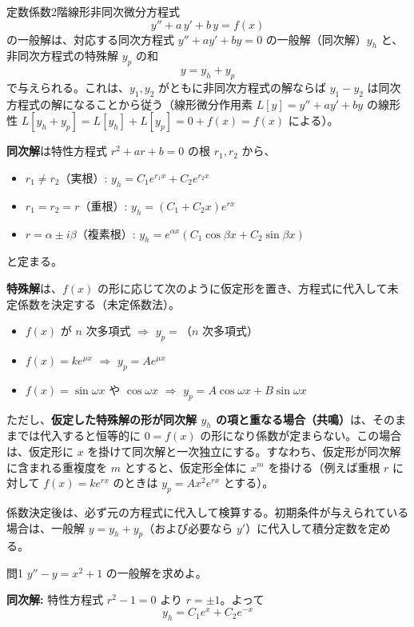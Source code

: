 \documentclass[a4paper,11pt]{article}
\begin{document}


\noindent
定数係数2階線形非同次微分方程式
\[
y'' + a\,y' + b\,y = f(x)
\]
の一般解は、対応する同次方程式 $y'' + a y' + b y = 0$ の一般解（同次解）$y_h$ と、非同次方程式の特殊解 $y_p$ の和
\[
y = y_h + y_p
\]
で与えられる。これは、$y_1, y_2$ がともに非同次方程式の解ならば $y_1 - y_2$ は同次方程式の解になることから従う（線形微分作用素 $L[y] = y'' + ay' + by$ の線形性 $L[y_h+y_p] = L[y_h]+L[y_p] = 0 + f(x) = f(x)$ による）。

\medskip
\noindent
\textbf{同次解}は特性方程式 $r^2 + ar + b = 0$ の根 $r_1, r_2$ から、
\begin{itemize}
\item $r_1 \neq r_2$（実根）: $y_h = C_1 e^{r_1 x} + C_2 e^{r_2 x}$
\item $r_1 = r_2 = r$（重根）: $y_h = (C_1 + C_2 x)e^{rx}$
\item $r = \alpha \pm i\beta$（複素根）: $y_h = e^{\alpha x}(C_1\cos\beta x + C_2 \sin\beta x)$
\end{itemize}
と定まる。

\medskip
\noindent
\textbf{特殊解}は、$f(x)$ の形に応じて次のように仮定形を置き、方程式に代入して未定係数を決定する（未定係数法）。
\begin{itemize}
\item $f(x)$ が $n$ 次多項式 $\Rightarrow$ $y_p = $（$n$ 次多項式）
\item $f(x) = k e^{\mu x}$ $\Rightarrow$ $y_p = A e^{\mu x}$
\item $f(x) = \sin\omega x$ や $\cos\omega x$ $\Rightarrow$ $y_p = A\cos\omega x + B\sin\omega x$
\end{itemize}
ただし、\textbf{仮定した特殊解の形が同次解 $y_h$ の項と重なる場合（共鳴）}は、そのままでは代入すると恒等的に $0 = f(x)$ の形になり係数が定まらない。この場合は、仮定形に $x$ を掛けて同次解と一次独立にする。すなわち、仮定形が同次解に含まれる重複度を $m$ とすると、仮定形全体に $x^{m}$ を掛ける（例えば重根 $r$ に対して $f(x)=ke^{rx}$ のときは $y_p = Ax^{2}e^{rx}$ とする）。

\medskip
\noindent
係数決定後は、必ず元の方程式に代入して検算する。初期条件が与えられている場合は、一般解 $y = y_h + y_p$（および必要なら $y'$）に代入して積分定数を定める。

\clearpage
\begin{mondaiboxS}{問1}
$y'' - y = x^{2} + 1$ の一般解を求めよ。
\end{mondaiboxS}
\kaitou
\textbf{同次解:} 特性方程式 $r^{2} - 1 = 0$ より $r = \pm 1$。よって
\[
y_h = C_{1}e^{x} + C_{2}e^{-x}
\]
\end{document}
